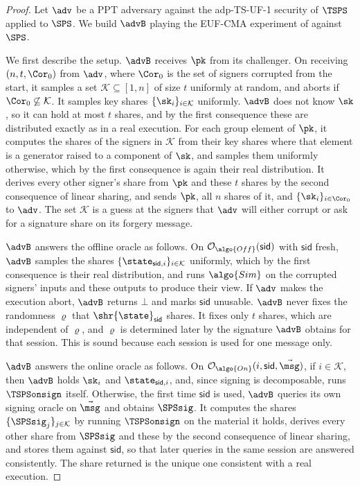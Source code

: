 \begin{proof}

  Let $\adv$ be a PPT adversary against the adp-TS-UF-1 security of
$\TSPS$ applied to $\SPS$. We build $\advB$ playing the EUF-CMA experiment of
 against $\SPS$.

  We first describe the setup. $\advB$ receives $\pk$ from its challenger. On receiving
$(n, t, \Cor_0)$ from $\adv$, where $\Cor_0$ is the set of signers corrupted
from the start, it samples a set $\mathcal{K} \subseteq [1,n]$ of
size $t$ uniformly at random, and aborts if $\Cor_0 \not\subseteq \mathcal{K}$.
It samples key shares $\{\sk_i\}_{i \in \mathcal{K}}$ uniformly. $\advB$ does
not know $\sk$, so it can hold at most $t$ shares, and by the first consequence these are
distributed exactly as in a real execution. For each group element of $\pk$, it
computes the shares of the signers in $\mathcal{K}$ from their key shares where
that element is a generator raised to a component of $\sk$, and samples them
uniformly otherwise, which by the first consequence is again their real distribution. It derives
every other signer's share from $\pk$ and these $t$ shares by the second
consequence of linear sharing, and sends $\pk$, all $n$ shares of it, and $\{\sk_i\}_{i
\in \Cor_0}$ to $\adv$. The set $\mathcal{K}$ is a guess at the signers that $\adv$ will
either corrupt or ask for a signature share on its forgery message.

  $\advB$ answers the offline oracle as follows. On $\mathcal{O}_{\algo{Off}}(\mathsf{sid})$ with
$\mathsf{sid}$ fresh, $\advB$ samples the shares
$\{\state_{\mathsf{sid},i}\}_{i \in \mathcal{K}}$ uniformly, which by the first consequence is
their real distribution, and runs $\algo{Sim}$ on the corrupted signers' inputs
and these outputs to produce their view. If $\adv$ makes the execution abort,
$\advB$ returns $\bot$ and marks $\mathsf{sid}$ unusable. $\advB$ never fixes the
randomness $\varrho$ that $\shr{\state}_{\mathsf{sid}}$ shares. It fixes only $t$
shares, which are independent of $\varrho$, and $\varrho$ is determined later by
the signature $\advB$ obtains for that session. This is sound because each
session is used for one message only.

  $\advB$ answers the online oracle as follows. On $\mathcal{O}_{\algo{On}}(i, \mathsf{sid},
\vec{\msg})$, if $i \in \mathcal{K}$, then $\advB$ holds $\sk_i$ and
$\state_{\mathsf{sid},i}$, and, since signing is decomposable, runs $\TSPSonsign$ itself. Otherwise, the
first time $\mathsf{sid}$ is used, $\advB$ queries its own signing oracle on
$\vec{\msg}$ and obtains $\SPSsig$. It computes the shares
$\{\SPSsig_j\}_{j \in \mathcal{K}}$ by running $\TSPSonsign$ on the material it
holds, derives every other share from $\SPSsig$ and these by the second
consequence of linear sharing, and stores them against $\mathsf{sid}$, so that later
queries in the same session are answered consistently. The share returned is the
unique one consistent with a real execution.


\end{proof}
